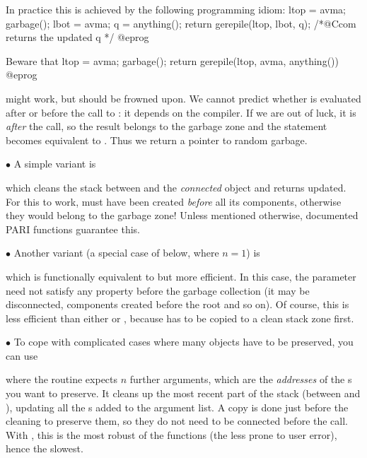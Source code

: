 \noindent In practice this is achieved by the following programming idiom:
\bprog
  ltop = avma; garbage(); lbot = avma; q = anything();
  return gerepile(ltop, lbot, q); /*@Ccom returns the updated q */
@eprog

\noindent Beware that
\bprog
  ltop = avma; garbage();
  return gerepile(ltop, avma, anything())
@eprog

\noindent might work, but should be frowned upon. We cannot predict whether
 is evaluated after or before the call to : it
depends on the compiler. If we are out of luck, it is \emph{after} the
call, so the result belongs to the garbage zone and the 
statement becomes equivalent to . Thus we return a
pointer to random garbage.

\noindent$\bullet$ A simple variant is


\noindent which cleans the stack between  and the \emph{connected}
object  and returns  updated. For this to work,  must
have been created \emph{before} all its components, otherwise they would
belong to the garbage zone! Unless mentioned otherwise, documented PARI
functions guarantee this.

\noindent$\bullet$ Another variant (a special case of 
below, where $n=1$) is


\noindent which is functionally equivalent to  but more efficient. In this case, the  parameter 
need not satisfy any property before the garbage collection (it may be
disconnected, components created before the root and so on). Of course, this
is less efficient than either  or , because
 has to be copied to a clean stack zone first.

\noindent$\bullet$
To cope with complicated cases where many objects have to be
preserved, you can use


\noindent where the routine expects $n$ further arguments, which are the
\emph{addresses} of the s you want to preserve. It cleans up the most
recent part of the stack (between  and ), updating all
the s added to the argument list. A copy is done just before the
cleaning to preserve them, so they do not need to be connected before the
call. With , this is the most robust of the 
functions (the less prone to user error), hence the slowest.

